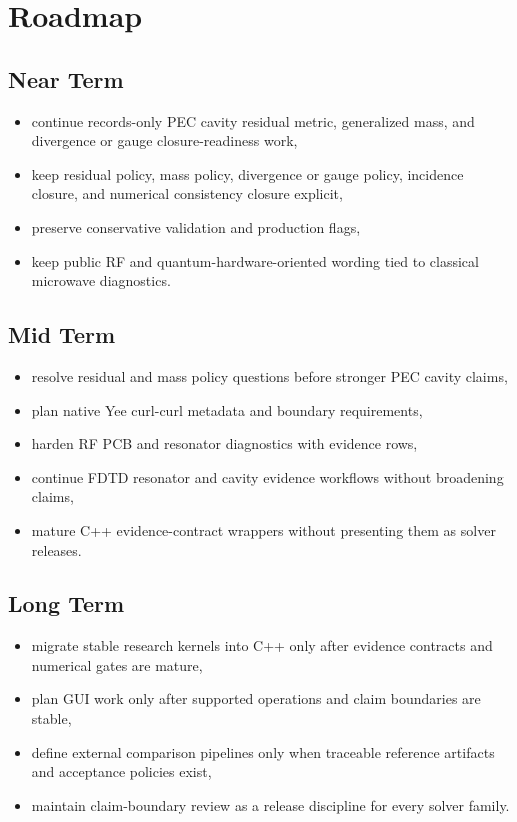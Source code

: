 \documentclass[11pt,a4paper]{article}
\begin{document}
\section{Roadmap}
\label{sec:roadmap}

\subsection{Near Term}

\begin{itemize}
  \item continue records-only PEC cavity residual metric, generalized mass, and divergence or gauge closure-readiness work,
  \item keep residual policy, mass policy, divergence or gauge policy, incidence closure, and numerical consistency closure explicit,
  \item preserve conservative validation and production flags,
  \item keep public RF and quantum-hardware-oriented wording tied to classical microwave diagnostics.
\end{itemize}

\subsection{Mid Term}

\begin{itemize}
  \item resolve residual and mass policy questions before stronger PEC cavity claims,
  \item plan native Yee curl-curl metadata and boundary requirements,
  \item harden RF PCB and resonator diagnostics with evidence rows,
  \item continue FDTD resonator and cavity evidence workflows without broadening claims,
  \item mature C++ evidence-contract wrappers without presenting them as solver releases.
\end{itemize}

\subsection{Long Term}

\begin{itemize}
  \item migrate stable research kernels into C++ only after evidence contracts and numerical gates are mature,
  \item plan GUI work only after supported operations and claim boundaries are stable,
  \item define external comparison pipelines only when traceable reference artifacts and acceptance policies exist,
  \item maintain claim-boundary review as a release discipline for every solver family.
\end{itemize}
\end{document}
